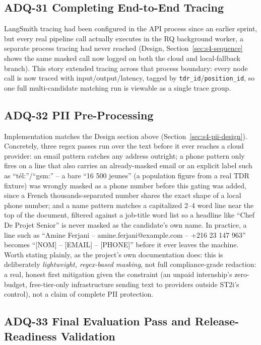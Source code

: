 \subsection{ADQ-31 Completing End-to-End Tracing}

LangSmith tracing had been configured in the API process since an
earlier sprint, but every real pipeline call actually executes in the RQ
background worker, a separate process tracing had never reached (Design,
Section~\ref{sec:s4-sequence} shows the same masked call now logged on
both the cloud and local-fallback branch). This story extended tracing
across that process boundary: every node call is now traced with
input/output/latency, tagged by \texttt{tdr\_id}/\texttt{position\_id},
so one full multi-candidate matching run is viewable as a single trace
group.

\subsection{ADQ-32 PII Pre-Processing}

Implementation matches the Design section above (Section~\ref{sec:s4-pii-design}).
Concretely, three regex passes run over the text before it ever reaches
a cloud provider: an email pattern catches any address outright; a
phone pattern only fires on a line that also carries an already-masked
email or an explicit label such as ``t\'el:''/``gsm:'' -- a bare ``16
500 jeunes'' (a population figure from a real TDR fixture) was wrongly
masked as a phone number before this gating was added, since a French
thousands-separated number shares the exact shape of a local phone
number; and a name pattern matches a capitalized 2--4 word line near the
top of the document, filtered against a job-title word list so a
headline like ``Chef De Projet Senior'' is never masked as the
candidate's own name. In practice, a line such as ``Amine Ferjani --
amine.ferjani@example.com -- +216 23 147 963'' becomes ``[NOM] --
[EMAIL] -- [PHONE]'' before it ever leaves the machine. Worth stating
plainly, as the project's own documentation does: this is deliberately
\emph{lightweight, regex-based masking}, not full compliance-grade
redaction: a real, honest first mitigation given the constraint (an
unpaid internship's zero-budget, free-tier-only infrastructure sending
text to providers outside ST2i's control), not a claim of complete PII
protection.

\subsection{ADQ-33 Final Evaluation Pass and Release-Readiness Validation}


